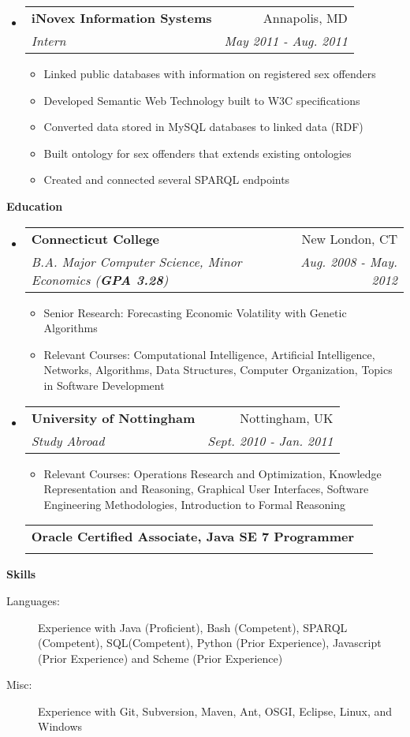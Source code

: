 \documentclass[letterpaper,11pt]{article}
\makeatletter
\newcommand{\resitem}[1]{\item #1 \vspace{-2pt}}
\newcommand{\resheading}[1]{{\large \colorbox{mygrey}{\begin{minipage}{\textwidth}{\textbf{#1 \vphantom{p\^{E}}}}\end{minipage}}}}
\newcommand{\ressubheading}[4]{
\begin{tabular*}{7.0in}{l@{\extracolsep{\fill}}r}
		\textbf{#1} & #2 \\
		\textit{#3} & \textit{#4} \\
\end{tabular*}\vspace{-6pt}}
\makeatother
\begin{document}
\begin{itemize}
	\item
	\ressubheading{iNovex Information Systems}{Annapolis, MD}{Intern}{May 2011 - Aug. 2011}
	\begin{itemize}
		\resitem{Linked public databases with information on registered sex offenders}
		\resitem{Developed Semantic Web Technology built to W3C specifications}
		\resitem{Converted data stored in MySQL databases to linked data (RDF)}
		\resitem{Built ontology for sex offenders that extends existing ontologies}
		\resitem{Created and connected several SPARQL endpoints}
	\end{itemize}
\end{itemize}

\resheading{Education}
\begin{itemize}
	\item
	\ressubheading{Connecticut College}{New London, CT}{B.A. Major Computer Science, Minor Economics (\textbf{GPA 3.28})}{Aug. 2008 - May. 2012}
	\begin{itemize}
		\resitem{Senior Research: Forecasting Economic Volatility with Genetic Algorithms}
		\resitem{Relevant Courses: Computational Intelligence, Artificial Intelligence, Networks, Algorithms, Data Structures, Computer Organization, Topics in Software Development}
	\end{itemize}
	
	\item
	\ressubheading{University of Nottingham}{Nottingham, UK}{Study Abroad}{Sept. 2010 - Jan. 2011}
	\begin{itemize}
		\resitem{Relevant Courses: Operations Research and Optimization, Knowledge Representation and Reasoning, Graphical User Interfaces, Software Engineering Methodologies, Introduction to Formal Reasoning}
	\end{itemize}
	\ressubheading{Oracle Certified Associate, Java SE 7 Programmer}{}{}{}
\end{itemize}

\resheading{Skills}
\begin{description}
	\item[Languages:]
		Experience with Java (Proficient), Bash (Competent), SPARQL (Competent), SQL(Competent), Python (Prior Experience), Javascript (Prior Experience) and Scheme (Prior Experience)
	\item[Misc:]
		Experience with Git, Subversion, Maven, Ant, OSGI, Eclipse, Linux, and Windows
\end{description}
\end{document}
